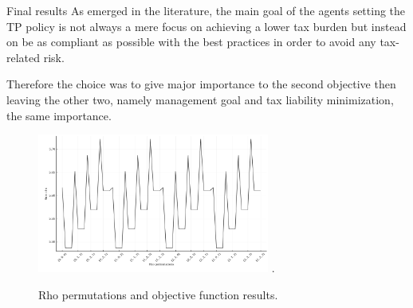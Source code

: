 \documentclass[10pt]{beamer}
\begin{document}
\begin{frame}[allowframebreaks]{Final results}
  As emerged in the literature, the main goal of the agents setting the TP policy is not always a mere focus on achieving a lower tax burden but instead on be as compliant as possible with the best practices in order to avoid any tax-related risk.

  Therefore the choice was to give major importance to the second objective then leaving the other two, namely management goal and tax liability minimization, the same importance.

\begin{figure}[]
\centering
\includegraphics[width=3in]{figure/Figure_1.png}
\DeclareGraphicsExtensions.
\caption{Rho permutations and objective function results.}
\label{last}
\end{figure}
\end{frame}
\end{document}
